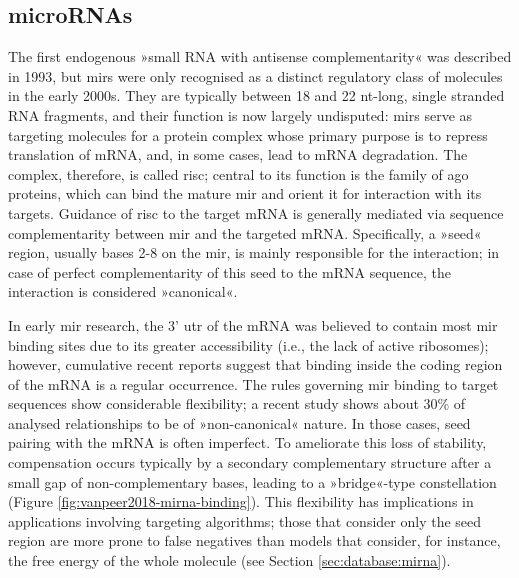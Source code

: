 \subsection{microRNAs} \label{sec:intro:mirna}
The first endogenous »small RNA with antisense complementarity« was described in 1993,\cite{Lee1993} but \acfp{mir} were only recognised as a distinct regulatory class of molecules in the early 2000s. They are typically between 18 and 22 \ac{nt}-long, single stranded RNA fragments, and their function is now largely undisputed: \acp{mir} serve as targeting molecules for a protein complex whose primary purpose is to repress translation of mRNA, and, in some cases, lead to mRNA degradation. The complex, therefore, is called \ac{risc}; central to its function is the family of \ac{ago} proteins, which can bind the mature \ac{mir} and orient it for interaction with its targets. Guidance of \ac{risc} to the target mRNA is generally mediated via sequence complementarity between \ac{mir} and the targeted mRNA. Specifically, a »seed« region, usually bases 2-8 on the \ac{mir}, is mainly responsible for the interaction; in case of perfect complementarity of this seed to the mRNA sequence, the interaction is considered »canonical«.

In early \ac{mir} research, the 3' \ac{utr} of the mRNA was believed to contain most \ac{mir} binding sites due to its greater accessibility (i.e., the lack of active ribosomes); however, cumulative recent reports suggest that binding inside the coding region of the mRNA is a regular occurrence.\cite{} The rules governing \ac{mir} binding to target sequences show considerable flexibility; a recent study shows about 30\% of analysed relationships to be of »non-canonical« nature.\cite{VanPeer2018} In those cases, seed pairing with the mRNA is often imperfect. To ameliorate this loss of stability, compensation occurs typically by a secondary complementary structure after a small gap of non-complementary bases, leading to a »bridge«-type constellation (Figure \ref{fig:vanpeer2018-mirna-binding}). This flexibility has implications in applications involving targeting algorithms; those that consider only the seed region are more prone to false negatives than models that consider, for instance, the free energy of the whole molecule (see Section \ref{sec:database:mirna}).

